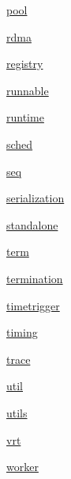 \begin{DoxyCompactItemize}
 \hyperlink{namespacevt_1_1pool}{pool}
\item 
 \hyperlink{namespacevt_1_1rdma}{rdma}
\item 
 \hyperlink{namespacevt_1_1registry}{registry}
\item 
 \hyperlink{namespacevt_1_1runnable}{runnable}
\item 
 \hyperlink{namespacevt_1_1runtime}{runtime}
\item 
 \hyperlink{namespacevt_1_1sched}{sched}
\item 
 \hyperlink{namespacevt_1_1seq}{seq}
\item 
 \hyperlink{namespacevt_1_1serialization}{serialization}
\item 
 \hyperlink{namespacevt_1_1standalone}{standalone}
\item 
 \hyperlink{namespacevt_1_1term}{term}
\item 
 \hyperlink{namespacevt_1_1termination}{termination}
\item 
 \hyperlink{namespacevt_1_1timetrigger}{timetrigger}
\item 
 \hyperlink{namespacevt_1_1timing}{timing}
\item 
 \hyperlink{namespacevt_1_1trace}{trace}
\item 
 \hyperlink{namespacevt_1_1util}{util}
\item 
 \hyperlink{namespacevt_1_1utils}{utils}
\item 
 \hyperlink{namespacevt_1_1vrt}{vrt}
\item 
 \hyperlink{namespacevt_1_1worker}{worker}
\end{DoxyCompactItemize}

